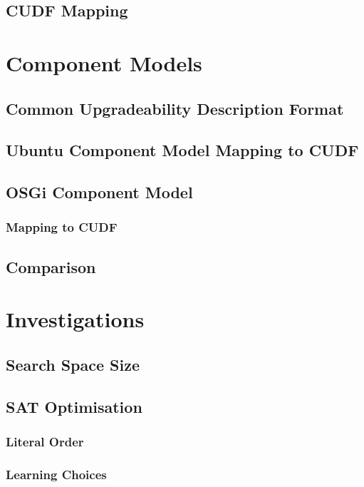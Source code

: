 \documentclass{report}
\begin{document}
\section{CUDF Mapping}



\chapter{Component Models}

\section{Common Upgradeability Description Format}

\section{Ubuntu Component Model Mapping to CUDF}

\section{OSGi Component Model}
\subsection{Mapping to CUDF}

\section{Comparison}

\chapter{Investigations}

\section{Search Space Size}

\section{SAT Optimisation}
\subsection{Literal Order}
\subsection{Learning Choices}
\end{document}
